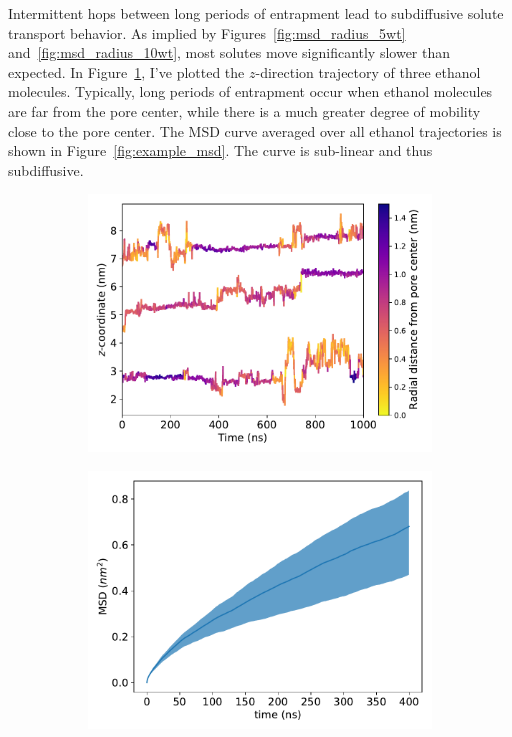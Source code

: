 \documentclass{article}
\begin{document}
  Intermittent hops between long periods of entrapment lead to subdiffusive
  solute transport behavior. As implied by Figures~\ref{fig:msd_radius_5wt} and~\ref{fig:msd_radius_10wt}, 
  most solutes move significantly slower than expected. In 
  Figure~\ref{fig:example_ztraces}, I've plotted the $z$-direction trajectory
  of three ethanol molecules. Typically, long periods of entrapment occur
  when ethanol molecules are far from the pore center, while there is a much 
  greater degree of mobility close to the pore center. The MSD curve averaged
  over all ethanol trajectories is shown in Figure~\ref{fig:example_msd}.
  The curve is sub-linear and thus subdiffusive.
  
  \begin{figure}
  \centering
  \begin{subfigure}{0.49\linewidth}
  \includegraphics[width=\linewidth]{colorful_example_ztraces.pdf}
  \caption{}\label{fig:example_ztraces}
  \end{subfigure}
  \begin{subfigure}{0.49\linewidth}
  \includegraphics[width=\linewidth]{example_msd.pdf}

\end{subfigure}
\end{figure}
\end{document}
